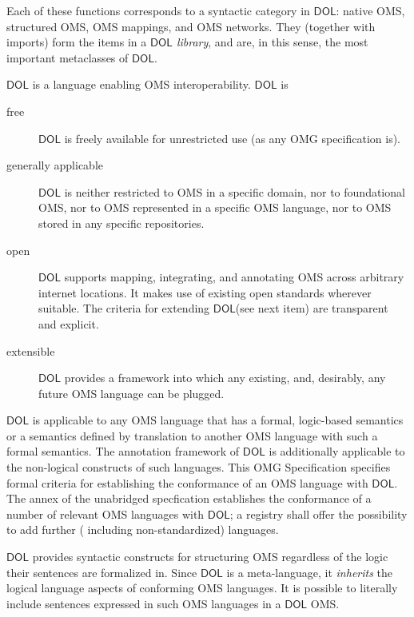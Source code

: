 \documentclass[10pt, a4paper]{isov2}
\newcommand*{\IS}{OMG Specification\xspace}
\newcommand*{\DOL}{\ensuremath{\mathsf{DOL}}\xspace}
\begin{document}
 Each of these functions corresponds to a syntactic category in \DOL: native OMS, structured
 OMS, OMS mappings, and OMS networks. They (together with imports) form the items in a
\emph{\DOL library}, and are, in this sense, the most important metaclasses of \DOL.


\sclause{Features of \DOL}\label{c:req:overview}

\DOL is a language enabling OMS interoperability.
\DOL is
\begin{description}
\item[free] \DOL is freely available for unrestricted use (as any OMG specification is).
\item[generally applicable] \DOL is neither restricted to OMS in a specific domain, nor to foundational OMS, nor to OMS represented in a specific OMS language, nor to OMS stored in any specific repositories.
\item[open] \DOL supports mapping, integrating, and annotating OMS across arbitrary internet locations.  It makes use of existing open standards wherever suitable.  The criteria for extending \DOL (see next item) are transparent and explicit.
\item[extensible] \DOL provides a framework into which any existing, and, desirably, any future OMS language can be plugged.
\end{description}
\DOL is applicable to any OMS language that has a formal, logic-based semantics or a semantics defined by translation to another OMS language with such a formal semantics. The annotation framework of \DOL is additionally applicable to the non-logical constructs of such languages. This \IS specifies formal criteria for establishing the conformance of an OMS language with \DOL.  The annex of the unabridged specfication establishes the conformance of a number of relevant OMS languages with \DOL; a registry shall offer the possibility to add further ( including non-standardized) languages.

\DOL provides syntactic constructs for structuring OMS regardless of the logic their sentences are formalized in.
Since \DOL is a meta-language,  it \textit{inherits} the logical language aspects of conforming OMS languages.  It is possible to literally include sentences expressed in such OMS languages in a \DOL OMS.
\end{document}
